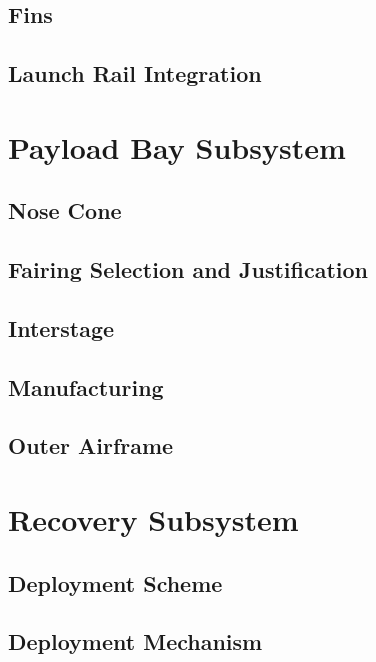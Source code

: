     \subsection{Fins}


    \subsection{Launch Rail Integration}
    
\section{Payload Bay Subsystem}

    \subsection{Nose Cone}
    
    \subsection{Fairing Selection and Justification}
    
    \subsection{Interstage}
    
    \subsection{Manufacturing}
    
    \subsection{Outer Airframe}
    
\section{Recovery Subsystem}

    \subsection{Deployment Scheme}
    
    \subsection{Deployment Mechanism}
    
